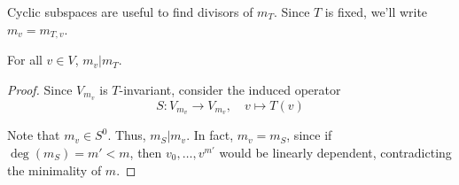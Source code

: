 Cyclic subspaces are useful to find divisors of $m_T$. Since $T$ is fixed, we'll write $m_v = m_{T,v}$. 

\begin{theorem}
	For all $v \in V$, $m_v | m_T$.
\end{theorem}

\begin{proof}
	Since $V_{m_v}$ is $T$-invariant, consider the induced operator
	\[
		S : V_{m_v} \longrightarrow V_{m_v}, \quad v \mapsto T(v)
	\]
	
	Note that $m_v \in S^0$. Thus, $m_S | m_v$. In fact, $m_v = m_S$, since if $\deg(m_S) = m' < m$, then $v_0, \ldots, v^{m'}$ would be linearly dependent, contradicting the minimality of $m$.
\end{proof}

%	
